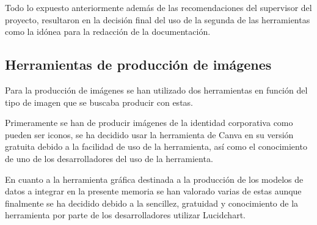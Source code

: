 Todo lo expuesto anteriormente además de las recomendaciones del supervisor del proyecto, resultaron en la decisión final del uso de la segunda de las herramientas como la idónea para la redacción de la documentación.

\subsection{Herramientas de producción de imágenes}

Para la producción de imágenes se han utilizado dos herramientas en función del tipo de imagen que se buscaba producir con estas. 

Primeramente se han de producir imágenes de la identidad corporativa como pueden ser iconos, se ha decidido usar la herramienta de Canva en su versión gratuita debido a la facilidad de uso de la herramienta, así como el conocimiento de uno de los desarrolladores del uso de la herramienta.

En cuanto a la herramienta gráfica destinada a la producción de los modelos de datos a integrar en la presente memoria se han valorado varias de estas aunque finalmente se ha decidido debido a la sencillez, gratuidad y conocimiento de la herramienta por parte de los desarrolladores utilizar Lucidchart.